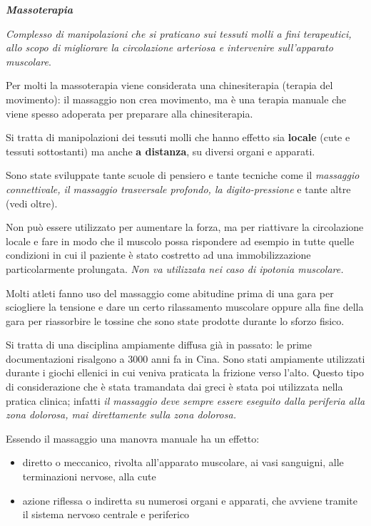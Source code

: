 \documentclass[]{article}
\date{}
\begin{document}
\emph{\textbf{Massoterapia}}

\emph{Complesso di manipolazioni che si praticano sui tessuti molli a
fini terapeutici, allo scopo di migliorare la circolazione arteriosa e
intervenire sull'apparato muscolare}.

Per molti la massoterapia viene considerata una chinesiterapia (terapia
del movimento): il massaggio non crea movimento, ma è una terapia
manuale che viene spesso adoperata per preparare alla chinesiterapia.

Si tratta di manipolazioni dei tessuti molli che hanno effetto sia
\textbf{locale} (cute e tessuti sottostanti) ma anche \textbf{a
distanza}, su diversi organi e apparati.

Sono state sviluppate tante scuole di pensiero e tante tecniche come il
\emph{massaggio connettivale, il massaggio trasversale profondo, la
digito-pressione} e tante altre (vedi oltre).

Non può essere utilizzato per aumentare la forza, ma per riattivare la
circolazione locale e fare in modo che il muscolo possa rispondere ad
esempio in tutte quelle condizioni in cui il paziente è stato costretto
ad una immobilizzazione particolarmente prolungata. \emph{Non va
utilizzata nei caso di ipotonia muscolare.}

Molti atleti fanno uso del massaggio come abitudine prima di una gara
per sciogliere la tensione e dare un certo rilassamento muscolare oppure
alla fine della gara per riassorbire le tossine che sono state prodotte
durante lo sforzo fisico.

Si tratta di una disciplina ampiamente diffusa già in passato: le prime
documentazioni risalgono a 3000 anni fa in Cina. Sono stati ampiamente
utilizzati durante i giochi ellenici in cui veniva praticata la frizione
verso l'alto. Questo tipo di considerazione che è stata tramandata dai
greci è stata poi utilizzata nella pratica clinica; infatti \emph{il
massaggio deve sempre essere eseguito dalla periferia alla zona
dolorosa, mai direttamente sulla zona dolorosa.}

Essendo il massaggio una manovra manuale ha un effetto:

\begin{itemize}
\item
  diretto o meccanico, rivolta all'apparato muscolare, ai vasi
  sanguigni, alle terminazioni nervose, alla cute
\item
  azione riflessa o indiretta su numerosi organi e apparati, che avviene
  tramite il sistema nervoso centrale e periferico
\end{itemize}
\end{document}
